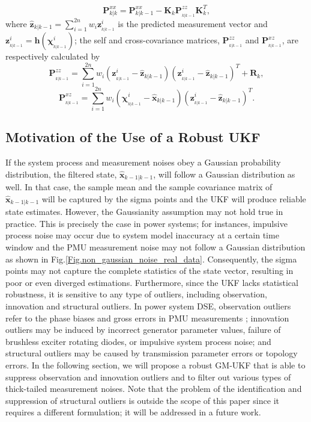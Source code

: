 \documentclass[10pt]{IEEEtran}
\begin{document}
\begin{equation}
{\bm{P}_{k\left| k \right.}^{xx}} = {\bm{P}_{k\left| {k - 1} \right.}^{xx}} - {\bm{K}_k}\bm{P}_{_{k\left| {k - 1} \right.}}^{zz}\bm{K}_k^T,
\label{Eq:ukf_covariance_matrix_updating}
\end{equation}
where ${\bm{\widehat z}_{k| {k - 1}}} = \sum\limits_{i = 1}^{2n} {{w_i}} \bm{z}_{_{k|{k - 1}}}^i$ is the predicted measurement vector and $\bm{z}_{_{k| {k - 1}}}^i = \bm{h}({\bm{\chi}_{_{k| {k - 1}}}^i})$; the self and cross-covariance matrices, $\bm{P}_{_{k| {k - 1}}}^{zz}$ and $\bm{P}_{_{k| {k - 1}}}^{xz}$, are respectively calculated by
\begin{equation}
\bm{P}_{_{k| {k - 1}}}^{zz} = \sum\limits_{i = 1}^{2n} {{w_i}}( {\bm{z}_{_{k| {k - 1}}}^i - {{\bm{\widehat z}}_{k| {k - 1}}}}){( {\bm{z}_{_{k| {k - 1}}}^i - {{\bm{\widehat z}}_{k|{k-1}}}})^T} + {\bm{R}_k},
\label{Eq:ukf_cross_covariance_matrix_zz}
\end{equation}
\begin{equation}
\bm{P}_{_{k| {k - 1}}}^{xz} = \sum\limits_{i = 1}^{2n} {{w_i}}( {\bm{\chi}_{_{k| {k - 1}}}^i - {{\bm{\widehat x}}_{k| {k - 1}}}}){( {\bm{z}_{_{k| {k - 1}}}^i - {{\bm{\widehat z}}_{k|{k-1}}}})^T}.
\label{Eq:ukf_cross_covariance_matrix_xz}
\end{equation}
\subsection{Motivation of the Use of a Robust UKF}
If the system process and measurement noises obey a Gaussian probability distribution, the filtered state, ${\bm{\widehat {x}}_{k - 1| {k -1}}}$, will follow a Gaussian distribution as well. In that case, the sample mean and the sample covariance matrix of ${\bm{\widehat {x}}_{k - 1| {k -1}}}$ will be captured by the sigma points and the UKF will produce reliable state estimates. However, the Gaussianity assumption may not hold true in practice. This is precisely the case in power systems; for instances, impulsive process noise may occur due to system model inaccuracy at a certain time window and the PMU measurement noise may not follow a Gaussian distribution as shown in Fig.\ref{Fig.non_gaussian_noise_real_data}. Consequently, the sigma points may not capture the complete statistics of the state vector, resulting in poor or even diverged estimations. Furthermore, since the UKF lacks statistical robustness, it is sensitive to any type of outliers, including observation, innovation and structural outliers. In power system DSE, observation outliers refer to the phase biases and gross errors in PMU measurements \cite{KAThorp2015}; innovation outliers may be induced by incorrect generator parameter values, failure of brushless exciter rotating diodes, or impulsive system process noise; and structural outliers may be caused by transmission parameter errors or topology errors. In the following section, we will propose a robust GM-UKF that is able to suppress observation and innovation outliers and to filter out various types of thick-tailed measurement noises. Note that the problem of the identification and suppression of structural outliers is outside the scope of this paper since it requires a different formulation; it will be addressed in a future work.
\vspace{-0.2cm}
\end{document}
